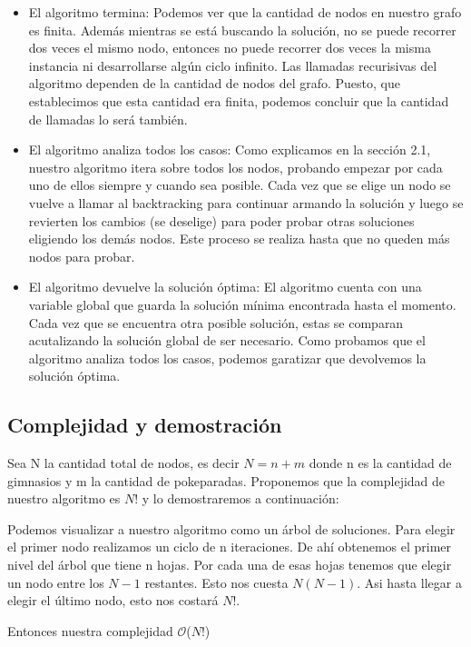 \documentclass[spanish,12pt]{article}
\begin{document}
\begin{itemize}
	\item El algoritmo termina:
Podemos ver que la cantidad de nodos en nuestro grafo es finita. Además mientras se está buscando la solución, no se puede recorrer dos veces el mismo nodo, entonces no puede recorrer dos veces la misma instancia ni desarrollarse algún ciclo infinito. Las llamadas recurisivas del algoritmo dependen de la cantidad de nodos del grafo. Puesto, que establecimos que esta cantidad era finita, podemos concluir que la cantidad de llamadas lo será también.
	\item El algoritmo analiza todos los casos:
Como explicamos en la sección 2.1, nuestro algoritmo itera sobre todos los nodos, probando empezar por cada uno de ellos siempre y cuando sea posible. Cada vez que se elige un nodo se vuelve a llamar al backtracking para continuar armando la solución y luego se revierten los cambios (se deselige) para poder probar otras soluciones eligiendo los demás nodos. Este proceso se realiza hasta que no queden más nodos para probar.
	\item El algoritmo devuelve  la solución óptima:
El algoritmo cuenta con una variable global que guarda la solución mínima encontrada hasta el momento. Cada vez que se encuentra otra posible solución, estas se comparan acutalizando la solución global de ser necesario. Como probamos que el algoritmo analiza todos los casos, podemos garatizar que devolvemos la solución óptima.    

\end{itemize}

\subsection{Complejidad y demostración}
Sea N la cantidad total de nodos, es decir $N=n+m$ donde n es la cantidad de gimnasios y m la cantidad de pokeparadas.
Proponemos que la complejidad de nuestro algoritmo es $N!$ y lo demostraremos a continuación:

Podemos visualizar a nuestro algoritmo como un árbol de soluciones. Para elegir el primer nodo realizamos un ciclo de n iteraciones. De ahí obtenemos el primer nivel del árbol que tiene n hojas. Por cada una de esas hojas tenemos que elegir un nodo entre los $N-1$ restantes. Esto nos cuesta $N(N-1)$.
Asi hasta llegar a elegir el último nodo, esto nos costará $N!$. 

Entonces nuestra complejidad $ \mathcal{O}$($N!$)  
\end{document}
